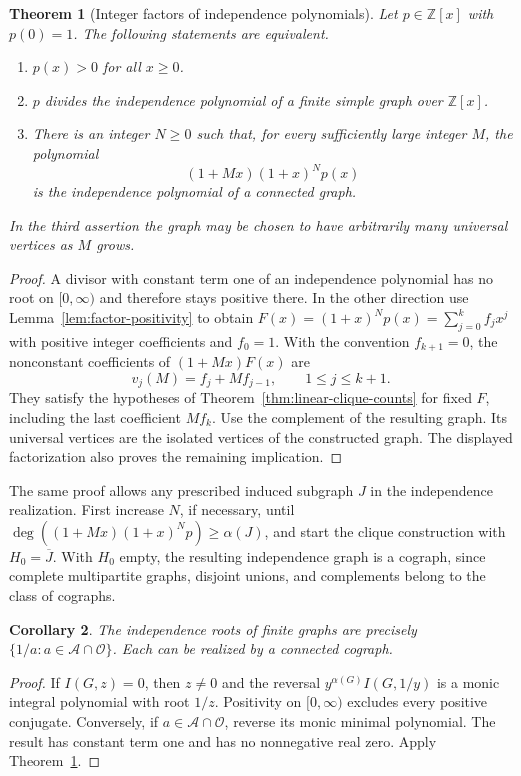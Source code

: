 \documentclass[11pt,a4paper]{article}
\newtheorem{theorem}{Theorem}[section]
\newtheorem{corollary}[theorem]{Corollary}
\begin{document}
\begin{theorem}[Integer factors of independence polynomials]
\label{thm:independence-factor}
Let $p\in\mathbb{Z}[x]$ with $p(0)=1$. The following statements are
equivalent.
\begin{enumerate}
\item $p(x)>0$ for all $x\ge0$.
\item $p$ divides the independence polynomial of a finite simple graph
over $\mathbb{Z}[x]$.
\item There is an integer $N\ge0$ such that, for every sufficiently
large integer $M$, the polynomial
\[
 (1+Mx)(1+x)^N p(x)
\]
is the independence polynomial of a connected graph.
\end{enumerate}
In the third assertion the graph may be chosen to have arbitrarily many
universal vertices as $M$ grows.
\end{theorem}
\begin{proof}
A divisor with constant term one of an independence polynomial has no
root on $[0,\infty)$ and therefore stays positive there. In the other
direction use Lemma~\ref{lem:factor-positivity} to obtain
$F(x)=(1+x)^Np(x)=\sum_{j=0}^k f_jx^j$ with positive integer
coefficients and $f_0=1$. With the convention $f_{k+1}=0$, the
nonconstant coefficients of $(1+Mx)F(x)$ are
\[
 v_j(M)=f_j+Mf_{j-1},\qquad 1\le j\le k+1.
\]
They satisfy the hypotheses of Theorem~\ref{thm:linear-clique-counts}
for fixed $F$, including the last coefficient $Mf_k$. Use the complement
of the resulting graph. Its universal vertices are the isolated vertices
of the constructed graph. The displayed factorization also proves the
remaining implication.
\end{proof}

The same proof allows any prescribed induced subgraph $J$ in the
independence realization. First increase $N$, if necessary, until
$\deg((1+Mx)(1+x)^Np)\ge\alpha(J)$, and start the clique construction
with $H_0=\overline J$. With $H_0$ empty, the resulting independence
graph is a cograph, since complete multipartite graphs, disjoint unions,
and complements belong to the class of cographs.

\begin{corollary}\label{cor:arithmetic}
The independence roots of finite graphs are precisely $\{1/a:a\in\mathcal A\cap\mathcal O\}$. Each can be realized by a connected cograph.
\end{corollary}
\begin{proof}
If $I(G,z)=0$, then $z\ne0$ and the reversal $y^{\alpha(G)}I(G,1/y)$ is a monic integral polynomial with root $1/z$. Positivity on $[0,\infty)$ excludes every positive conjugate. Conversely, if $a\in\mathcal A\cap\mathcal O$, reverse its monic minimal polynomial. The result has constant term one and has no nonnegative real zero. Apply Theorem~\ref{thm:independence-factor}.
\end{proof}
\end{document}
